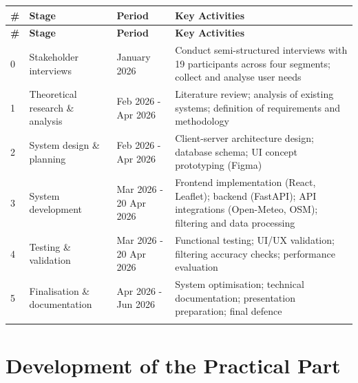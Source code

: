 \documentclass[12pt,a4paper]{report}
\begin{document}
\begin{tabularx}{\textwidth}{|>{\centering\arraybackslash}p{0.4cm}
                  |>{\raggedright\arraybackslash}p{2.8cm}
                  |>{\centering\arraybackslash}p{4.2cm}
                  |>{\raggedright\arraybackslash}X|}


\hline
\textbf{\#} & \textbf{Stage} & \textbf{Period} & \textbf{Key Activities} \\
\hline
\endfirsthead

\hline
\textbf{\#} & \textbf{Stage} & \textbf{Period} & \textbf{Key Activities} \\
\hline
\endhead

0 & Stakeholder interviews & January 2026 &
Conduct semi-structured interviews with 19 participants across four segments;
collect and analyse user needs \\
\hline

1 & Theoretical research \& analysis & Feb 2026 - Apr 2026 &
Literature review; analysis of existing systems; definition of requirements and methodology \\
\hline

2 & System design \& planning & Feb 2026 - Apr 2026 &
Client-server architecture design; database schema; UI concept prototyping (Figma) \\
\hline

3 & System development & Mar 2026 - 20 Apr 2026 &
Frontend implementation (React, Leaflet); backend (FastAPI); API integrations (Open-Meteo, OSM); filtering and data processing \\
\hline

4 & Testing \& validation & Mar 2026 - 20 Apr 2026 &
Functional testing; UI/UX validation; filtering accuracy checks; performance evaluation \\
\hline

5 & Finalisation \& documentation & Apr 2026 - Jun 2026 &
System optimisation; technical documentation; presentation preparation; final defence \\
\hline

\caption{\centering Project work plan by stage}
\label{tab:work_plan} \\

\end{tabularx}





\setcounter{chapter}{1}
\chapter{Development of the Practical Part}
\end{document}
